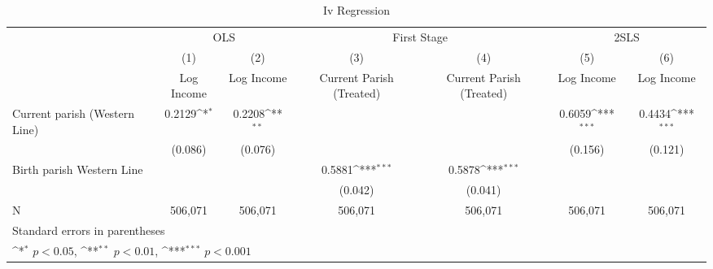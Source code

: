 \begin{table}[htbp]\centering
\def\sym#1{\ifmmode^{#1}\else\(^{#1}\)\fi}
\caption{Iv Regression \label{columns}}
\begin{tabular}{l*{6}{c}}
\hline\hline
                    &\multicolumn{2}{c}{OLS}                    &\multicolumn{2}{c}{First Stage}            &\multicolumn{2}{c}{2SLS}                   \\\cmidrule(lr){2-3}\cmidrule(lr){4-5}\cmidrule(lr){6-7}
                    &\multicolumn{1}{c}{(1)}&\multicolumn{1}{c}{(2)}&\multicolumn{1}{c}{(3)}&\multicolumn{1}{c}{(4)}&\multicolumn{1}{c}{(5)}&\multicolumn{1}{c}{(6)}\\
                    &\multicolumn{1}{c}{Log Income}&\multicolumn{1}{c}{Log Income}&\multicolumn{1}{c}{Current Parish (Treated)}&\multicolumn{1}{c}{Current Parish (Treated)}&\multicolumn{1}{c}{Log Income}&\multicolumn{1}{c}{Log Income}\\
\hline
Current parish (Western Line)&      0.2129\sym{*}  &      0.2208\sym{**} &                     &                     &      0.6059\sym{***}&      0.4434\sym{***}\\
                    &     (0.086)         &     (0.076)         &                     &                     &     (0.156)         &     (0.121)         \\
[1em]
Birth parish Western Line&                     &                     &      0.5881\sym{***}&      0.5878\sym{***}&                     &                     \\
                    &                     &                     &     (0.042)         &     (0.041)         &                     &                     \\
\hline
N                   &     506,071         &     506,071         &     506,071         &     506,071         &     506,071         &     506,071         \\
\hline\hline
\multicolumn{7}{l}{\footnotesize Standard errors in parentheses}\\
\multicolumn{7}{l}{\footnotesize \sym{*} \(p<0.05\), \sym{**} \(p<0.01\), \sym{***} \(p<0.001\)}\\
\end{tabular}
\end{table}
